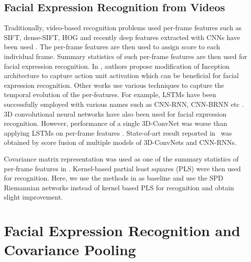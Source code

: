 \documentclass[10pt,twocolumn,letterpaper]{article}
\begin{document}
	\subsection{Facial Expression Recognition from Videos}
	
	Traditionally, video-based recognition problems used per-frame features such as SIFT, dense-SIFT, HOG \cite{emoti14} and recently deep features extracted with CNNs have been used \cite{emoti161} \cite{emoti167}. The per-frame features are then used to assign score to each individual frame. Summary statistics of such per-frame features are then used for facial expression recognition. In \cite{emoti151}, authors propose modification of Inception architecture to capture action unit activation which can be beneficial for facial expression recognition.	Other works use various techniques to capture the temporal evolution of the per-features. For example, LSTMs have been successfully employed with various names such as CNN-RNN, CNN-BRNN etc \cite{emoti153}\cite{emoti161}\cite{emoti1632}. 3D convolutional neural networks have also been used for facial expression recognition. However, performance of a single 3D-ConvNet was worse than applying LSTMs on per-frame features \cite{emoti161}. State-of-art result reported in~\cite{emoti161} was obtained by score fusion of multiple models of 3D-ConvNets and CNN-RNNs.
		
	Covariance matrix representation was used as one of the summary statistics of per-frame features in \cite{emoti14}. Kernel-based partial least squares (PLS) were then used for recognition. Here, we use the methods in \cite{emoti14} as baseline and use the SPD Riemannian networks instead of kernel based PLS for recognition and obtain slight improvement.


	\section{Facial Expression Recognition and Covariance Pooling}
	
	
\end{document}
